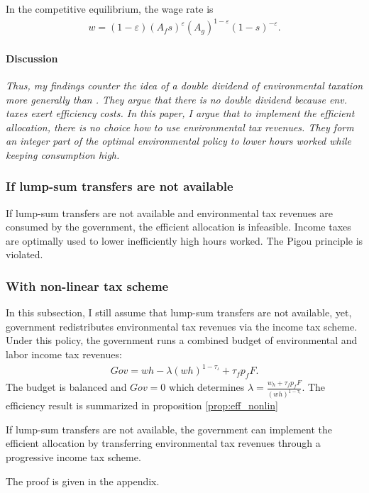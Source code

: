 In the competitive equilibrium, the wage rate is
\begin{align}
w= (1-\varepsilon)(A_fs)^\varepsilon (A_g)^{1-\varepsilon}(1-s)^{-\varepsilon}. \label{eq:compw}
\end{align}

\paragraph{Discussion}
\textit{Thus, my findings counter the idea of a double dividend of environmental taxation more generally than \cite{LansBovenberg1994EnvironmentalTaxation}. They argue that there is no double dividend because env. taxes exert efficiency costs. In this paper, I argue that to implement the efficient allocation, there is no choice how to use environmental tax revenues. They form an integer part of the optimal environmental policy to lower hours worked while keeping consumption high.}


\subsubsection{If lump-sum transfers are not available}
\begin{prop}\label{prop:no_red}
	If lump-sum transfers are not available and environmental tax revenues are consumed by the government, the efficient allocation is infeasible. Income taxes are optimally used to lower inefficiently high hours worked. The Pigou principle is violated. 
\end{prop}


\subsubsection{With non-linear tax scheme}
In this subsection, I still assume that lump-sum transfers are not available, yet, government redistributes environmental tax revenues via the income tax scheme.
Under this policy, the government runs a combined budget of environmental and labor income tax revenues:  
\begin{align}
Gov= wh-\lambda (wh)^{1-\tau_\iota}+\tau_f p_fF.
\end{align}
The budget is balanced and $Gov = 0$ which determines $\lambda=\frac{w_h + \tau_f p_f F}{(wh)^{1-\tau_{\iota}}}$. The efficiency result is summarized in proposition \ref{prop:eff_nonlin}
\begin{prop}\label{prop:eff_nonlin}
	If lump-sum transfers are not available, the government can implement the efficient allocation by  transferring environmental tax revenues through a progressive income tax scheme.
\end{prop}
The proof is given in the appendix. 

